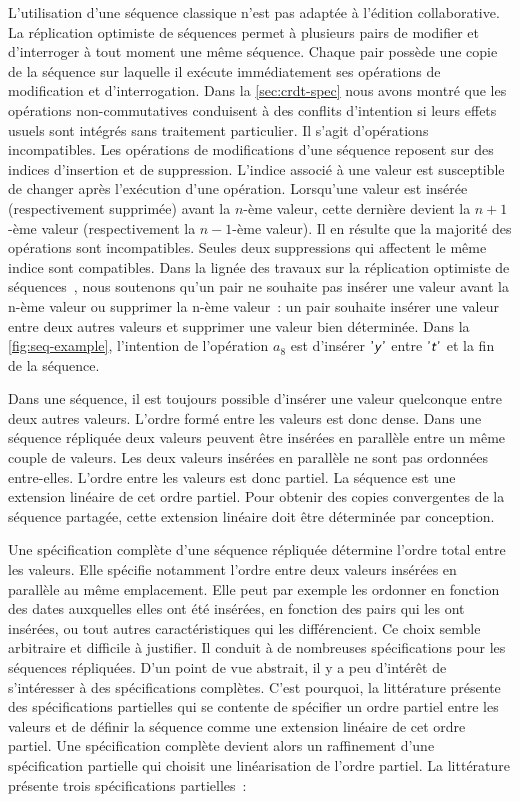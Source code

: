 L'utilisation d'une séquence classique n'est pas adaptée à l'édition collaborative.
La réplication optimiste de séquences permet à plusieurs pairs de modifier et d'interroger à tout moment une même séquence.
Chaque pair possède une copie de la séquence sur laquelle il exécute immédiatement ses opérations de modification et d'interrogation.
Dans la \autoref{sec:crdt-spec} nous avons montré que les opérations non-commutatives conduisent à des conflits d'intention si leurs effets usuels sont intégrés sans traitement particulier.
Il s'agit d'opérations incompatibles.
Les opérations de modifications d'une séquence reposent sur des indices d'insertion et de suppression.
L'indice associé à une valeur est susceptible de changer après l'exécution d'une opération.
Lorsqu'une valeur est insérée (respectivement supprimée) avant la $n$-ème valeur, cette dernière devient la $n+1$-ème valeur (respectivement la $n-1$-ème valeur).
Il en résulte que la majorité des opérations sont incompatibles.
Seules deux suppressions qui affectent le même indice sont compatibles.
Dans la lignée des travaux sur la réplication optimiste de séquences~\autocite{oster_2006_woot,sun_1998_cci}, nous soutenons qu'un pair ne souhaite pas insérer une valeur avant la n-ème valeur ou supprimer la n-ème valeur~:
un pair souhaite insérer une valeur entre deux autres valeurs et supprimer une valeur bien déterminée.
Dans la \autoref{fig:seq-example}, l'intention de l'opération $a_8$ est d'insérer $\textsf{'\textit{y}'}$ entre $\textsf{'\textit{t}'}$ et la fin de la séquence.

Dans une séquence, il est toujours possible d'insérer une valeur quelconque entre deux autres valeurs.
L'ordre formé entre les valeurs est donc dense.
Dans une séquence répliquée deux valeurs peuvent être insérées en parallèle entre un même couple de valeurs.
Les deux valeurs insérées en parallèle ne sont pas ordonnées entre-elles.
L'ordre entre les valeurs est donc partiel.
La séquence est une extension linéaire de cet ordre partiel.
Pour obtenir des copies convergentes de la séquence partagée, cette extension linéaire doit être déterminée par conception.

Une spécification complète d'une séquence répliquée détermine l'ordre total entre les valeurs.
Elle spécifie notamment l'ordre entre deux valeurs insérées en parallèle au même emplacement.
Elle peut par exemple les ordonner en fonction des dates auxquelles elles ont été insérées, en fonction des pairs qui les ont insérées, ou tout autres caractéristiques qui les différencient.
Ce choix semble arbitraire et difficile à justifier.
Il conduit à de nombreuses spécifications pour les séquences répliquées.
D'un point de vue abstrait, il y a peu d'intérêt de s'intéresser à des spécifications complètes.
C'est pourquoi, la littérature présente des spécifications partielles qui se contente de spécifier un ordre partiel entre les valeurs et de définir la séquence comme une extension linéaire de cet ordre partiel.
Une spécification complète devient alors un raffinement d'une spécification partielle qui choisit une linéarisation de l'ordre partiel.
La littérature présente trois spécifications partielles~:

